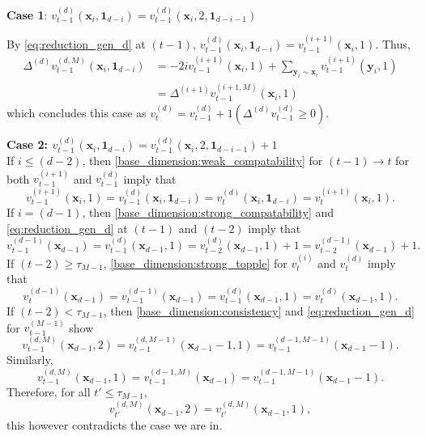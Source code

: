 \documentclass[12pt]{amsart}
\begin{document}
	
	{\bf Case 1}: $v_{t-1}^{(d)}(\mathbf{x}_{i}, \mathbf{1}_{d-i}) = v_{t-1}^{(d)}(\mathbf{x}_{i},2, \mathbf{1}_{d-i-1})$
	
	 By \eqref{eq:reduction_gen_d} at $(t-1)$, $v_{t-1}^{(d)}(\mathbf{x}_i, \mathbf{1}_{d-i}) = v_{t-1}^{(i+1)}(\mathbf{x}_{i},1)$.
	Thus,
	\begin{align*}
	\Delta^{(d)} v_{t-1}^{(d,M)}(\mathbf{x}_{i}, \mathbf{1}_{d-i}) &= -2 i v_{t-1}^{(i+1)}(\mathbf{x}_{i},1) +  \sum_{\mathbf{y}_{i} \sim \mathbf{x}_{i}} v_{t-1}^{(i+1)}(\mathbf{y}_{i},1)  \\
	&=  \Delta^{(i+1)} v_{t-1}^{(i+1,M)}(\mathbf{x}_{i},1)
	\end{align*}
	which concludes this case as $v_{t}^{(d)} = v_{t-1}^{(d)} + 1(\Delta^{(d)} v_{t-1}^{(d)} \geq 0)$. 	

	
	{\bf Case 2: $v_{t-1}^{(d)}(\mathbf{x}_{i}, \mathbf{1}_{d-i}) = v_{t-1}^{(d)}(\mathbf{x}_{i},2, \mathbf{1}_{d-i-1}) + 1$} \\
	If $i \leq (d-2)$, then \eqref{base_dimension:weak_compatability} for $(t-1) \to t$
	for both $v_{t-1}^{(i+1)}$ and $v_{t-1}^{(d)}$ imply that 
	\[
	v_{t-1}^{(i+1)}(\mathbf{x}_i,1) = v_{t-1}^{(d)}(\mathbf{x}_{i}, \mathbf{1}_{d-i})  = v_{t}^{(d)}(\mathbf{x}_{i}, \mathbf{1}_{d-i}) = v_{t}^{(i+1)}(\mathbf{x}_i,1).
	\]
	If $i = (d-1)$, then \eqref{base_dimension:strong_compatability} and \eqref{eq:reduction_gen_d} at $(t-1)$ and $(t-2)$ imply that 
	\[
	v_{t-1}^{(d-1)}(\mathbf{x}_{d-1}) = v_{t-1}^{(d)}(\mathbf{x}_{d-1},1) = v_{t-2}^{(d)}(\mathbf{x}_{d-1},1)+1 = 
	v_{t-2}^{(d-1)}(\mathbf{x}_{d-1})+1.
	\]	
	If $(t-2) \geq \tau_{M-1}$, \eqref{base_dimension:strong_topple} for $v_t^{(i)}$ and $v_t^{(d)}$  imply that
	\[
	v_{t}^{(d-1)}(\mathbf{x}_{d-1}) =	v_{t-1}^{(d-1)}(\mathbf{x}_{d-1}) = v_{t-1}^{(d)}(\mathbf{x}_{d-1},1) = v_{t}^{(d)}(\mathbf{x}_{d-1},1).
	\]
	If $(t-2) < \tau_{M-1}$, then \eqref{base_dimension:consistency} and \eqref{eq:reduction_gen_d} for $v_{t-1}^{(M-1)}$ show
	\[
	v_{t-1}^{(d,M)}(\mathbf{x}_{d-1},2) = v_{t-1}^{(d,M-1)}(\mathbf{x}_{d-1}-1,1) = v_{t-1}^{(d-1,M-1)}(\mathbf{x}_{d-1}-1).
	\]
	Similarly, 
	\[
	v_{t-1}^{(d,M)}(\mathbf{x}_{d-1},1) = v_{t-1}^{(d-1,M)}(\mathbf{x}_{d-1}) = v_{t-1}^{(d-1,M-1)}(\mathbf{x}_{d-1}-1).
	\]
	Therefore, for all $t' \leq \tau_{M-1}$, 
	\begin{equation} \label{eq:reflecting_boundaries}
	v_{t'}^{(d,M)}(\mathbf{x}_{d-1},2) = v_{t'}^{(d,M)}(\mathbf{x}_{d-1},1),
	\end{equation}
	this however contradicts the case we are in. 
\end{document}

